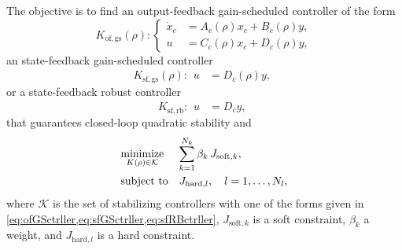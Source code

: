 \documentclass[fleqn,11pt]{article}
\newcommand{\p}{\rho}
\begin{document}
The objective is to find an output-feedback gain-scheduled controller of the form
\begin{equation}\label{eq:ofGSctrller}
    K_\mathrm{of,gs}(\p):\left\{
    \begin{aligned}
        \dot x_c &= A_c(\p)x_c + B_c(\p)y,\\
        u        &= C_c(\p)x_c + D_c(\p)y,
    \end{aligned}\right.
\end{equation}
an state-feedback gain-scheduled controller
\begin{equation}\label{eq:sfGSctrller}
    K_\mathrm{sf,gs}(\p):\left.
    \begin{aligned}
        u        &= D_c(\p)y,
    \end{aligned}\right.
\end{equation}
or a state-feedback robust controller
\begin{equation}\label{eq:sfRBctrller}
    K_\mathrm{sf,rb}:\left.
    \begin{aligned}
        u        &= D_cy,
    \end{aligned}\right.
\end{equation}
that guarantees closed-loop quadratic stability and
\begin{equation}\label{eq:synProblem}
    \begin{array}{>{\displaystyle}l>{\displaystyle}l}
        \underset{K(\p)\in\mathcal{K}}{\text{minimize}}      &
        \sum_{k=1}^{N_k} \beta_k\,J_{\mathrm{soft},k},\\[3ex]
        \text{subject to} & J_{\mathrm{hard},l},\quad l=1,\dots,N_l,
    \end{array}
\end{equation}
where $\mathcal{K}$ is the set of stabilizing controllers with one of the forms given in  \cref{eq:ofGSctrller,eq:sfGSctrller,eq:sfRBctrller}, $J_{\mathrm{soft},k}$ is a soft constraint, $\beta_k$ a weight, and
$J_{\mathrm{hard},l}$ is a hard constraint.
\end{document}
